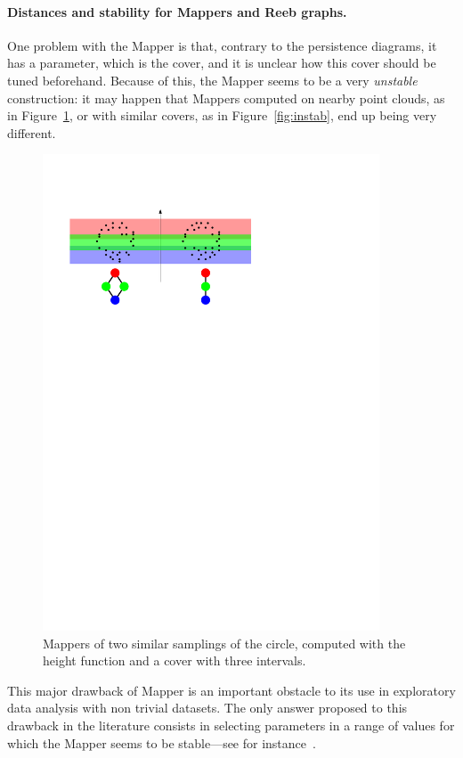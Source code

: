 \paragraph*{Distances and stability for Mappers and Reeb graphs.}
%
One problem with the Mapper is that, contrary to the persistence diagrams, it has a parameter, which is the cover,
and it is unclear how this cover should be tuned beforehand.
Because of this, %
the Mapper seems to be a very {\em unstable} construction:
it may happen that Mappers computed on nearby point clouds, 
as in Figure~\ref{fig:instabMapper}, or with similar covers, as in Figure~\ref{fig:instab},
end up being very different.

\begin{figure}[h]\centering
\includegraphics[width=10cm]{figures/ExampleInstabilityMapper}
\caption[Instability of Mapper computed on nearby spaces]{\label{fig:instabMapper} Mappers of two similar samplings of the circle, computed with the height function
and a cover with three intervals.}
\end{figure}

This major drawback of Mapper is an important obstacle to its use  
in exploratory data analysis with non trivial datasets. %
The only answer proposed to 
this drawback in the literature consists in selecting parameters in a range of values for which 
the Mapper seems to be stable---see for instance~\cite{Nielson15}. 

